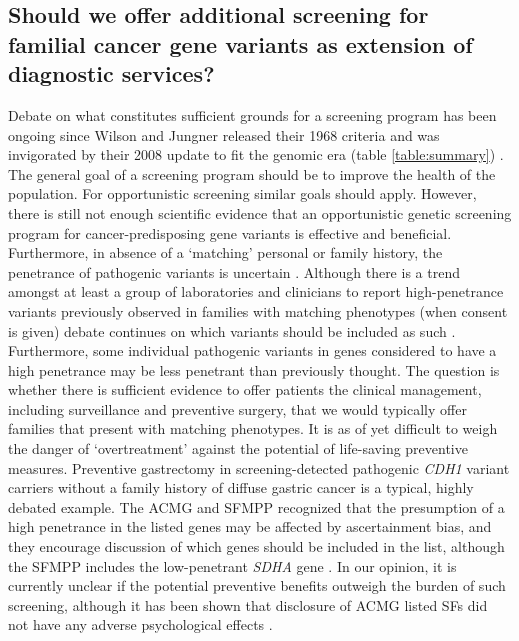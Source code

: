 \subsection[Should we offer additional screening?]{Should we offer additional screening for familial cancer gene variants as extension of diagnostic services?}
Debate on what constitutes sufficient grounds for a screening program has been ongoing since Wilson and Jungner released their 1968 criteria and was invigorated by their 2008 update to fit the genomic era (table \ref{table:summary}) \cite{Andermann_2008}. %
The general goal of a screening program should be to improve the health of the population. For opportunistic screening similar goals should apply. 
However, there is still not enough scientific evidence that an opportunistic genetic screening program for cancer-predisposing gene variants is effective and beneficial. Furthermore, in absence of a ‘matching’ personal or family history, the penetrance of pathogenic variants is uncertain \cite{Brothers_2019}. 
Although there is a trend amongst at least a group of laboratories and clinicians to report high-penetrance variants previously observed in families with matching phenotypes (when consent is given) debate continues on which variants should be included as such \cite{Pujol_2018,Shkedi_Rafid_2014,Braverman_2018}. 
Furthermore, some individual pathogenic variants in genes considered to have a high penetrance may be less penetrant than previously thought. 
The question is whether there is sufficient evidence to offer patients the clinical management, including surveillance and preventive surgery, that we would typically offer families that present with matching phenotypes. It is as of yet difficult to weigh the danger of ‘overtreatment’ against the potential of life-saving preventive measures. 
Preventive gastrectomy in screening-detected pathogenic \textsl{CDH1} variant carriers without a family history of diffuse gastric cancer is a typical, highly debated example. 
The ACMG and SFMPP recognized that the presumption of a high penetrance in the listed genes may be affected by ascertainment bias, and they encourage discussion of which genes should be included in the list, although the SFMPP includes the low-penetrant \textsl{SDHA} gene \cite{Kalia_2016,Pujol_2018}. 
In our opinion, it is currently unclear if the potential preventive benefits outweigh the burden of such screening, although it has been shown that disclosure of ACMG listed SFs did not have any adverse psychological effects \cite{Olfson_2015}. 

